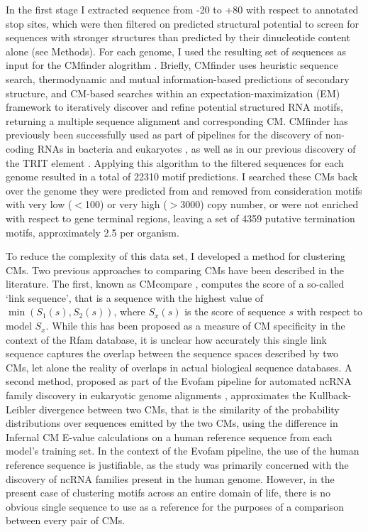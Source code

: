 In the first stage I extracted sequence from -20 to +80 with respect to annotated stop sites, which were then filtered on predicted structural potential to screen for sequences with stronger structures than predicted by their dinucleotide content alone (see Methods). For each genome, I used the resulting set of sequences as input for the CMfinder alogrithm \parencite{Yao2006}. Briefly, CMfinder uses heuristic sequence search, thermodynamic and mutual information-based predictions of secondary structure, and CM-based searches within an expectation-maximization (EM) framework to iteratively discover and refine potential structured RNA motifs, returning a multiple sequence alignment and corresponding CM. CMfinder has previously been successfully used as part of pipelines for the discovery of non-coding RNAs in bacteria \parencite{Weinberg2007, Weinberg2010} and eukaryotes \parencite{Torarinsson2008a}, as well as in our previous discovery of the TRIT element \parencite{Gardner2011a}. Applying this algorithm to the filtered sequences for each genome resulted in a total of 22310 motif predictions. I searched these CMs back over the genome they were predicted from and removed from consideration motifs with very low ($<$100) or very high ($>3000$) copy number, or were not enriched with respect to gene terminal regions, leaving a set of 4359 putative termination motifs, approximately 2.5 per organism.

To reduce the complexity of this data set, I developed a method for clustering CMs. Two previous approaches to comparing CMs have been described in the literature. The first, known as CMcompare \parencite{Honer-zu-Siederdissen2010}, computes the score of a so-called `link sequence', that is a sequence with the highest value of $\min{(S_1(s), S_2(s))}$, where $S_x(s)$ is the score of sequence $s$ with respect to model $S_x$. While this has been proposed as a measure of CM specificity in the context of the Rfam database, it is unclear how accurately this single link sequence captures the overlap between the sequence spaces described by two CMs, let alone the reality of overlaps in actual biological sequence databases. A second method, proposed as part of the Evofam pipeline for automated ncRNA family discovery in eukaryotic genome alignments \parencite{Parker2011}, approximates the Kullback-Leibler divergence between two CMs, that is the similarity of the probability distributions over sequences emitted by the two CMs, using the difference in Infernal CM E-value calculations on a human reference sequence from each model's training set. In the context of the Evofam pipeline, the use of the human reference sequence is justifiable, as the study was primarily concerned with the discovery of ncRNA families present in the human genome. However, in the present case of clustering motifs across an entire domain of life, there is no obvious single sequence to use as a reference for the purposes of a comparison between every pair of CMs.

